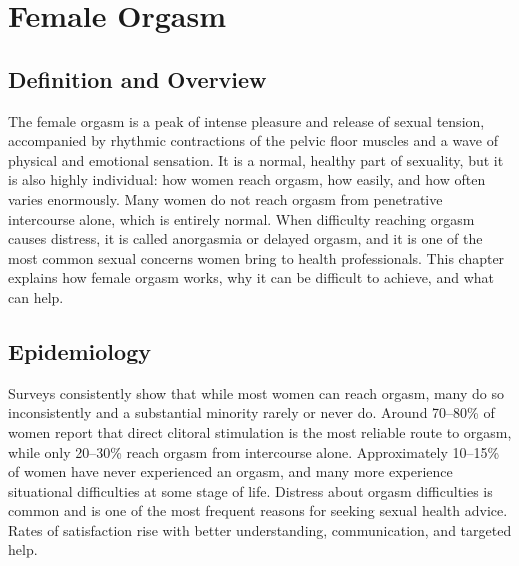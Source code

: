 \chapter{Female Orgasm}

\section*{Definition and Overview}
The female orgasm is a peak of intense pleasure and release of sexual tension, accompanied by rhythmic contractions of the pelvic floor muscles and a wave of physical and emotional sensation. It is a normal, healthy part of sexuality, but it is also highly individual: how women reach orgasm, how easily, and how often varies enormously. Many women do not reach orgasm from penetrative intercourse alone, which is entirely normal. When difficulty reaching orgasm causes distress, it is called anorgasmia or delayed orgasm, and it is one of the most common sexual concerns women bring to health professionals. This chapter explains how female orgasm works, why it can be difficult to achieve, and what can help.

\section*{Epidemiology}
Surveys consistently show that while most women can reach orgasm, many do so inconsistently and a substantial minority rarely or never do. Around 70--80\% of women report that direct clitoral stimulation is the most reliable route to orgasm, while only 20--30\% reach orgasm from intercourse alone. Approximately 10--15\% of women have never experienced an orgasm, and many more experience situational difficulties at some stage of life. Distress about orgasm difficulties is common and is one of the most frequent reasons for seeking sexual health advice. Rates of satisfaction rise with better understanding, communication, and targeted help.

